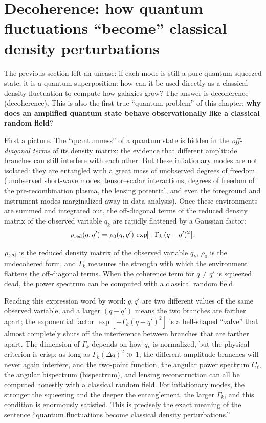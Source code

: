 \section{Decoherence: how quantum fluctuations ``become'' classical density perturbations}
\label{sec:e23-decoherence}

The previous section left an unease: if each mode is still a pure quantum squeezed state, it is a quantum superposition: how can it be used directly as a classical density fluctuation to compute how galaxies grow? The answer is decoherence (decoherence). This is also the first true ``quantum problem'' of this chapter: \textbf{why does an amplified quantum state behave observationally like a classical random field}?

First a picture. The ``quantumness'' of a quantum state is hidden in the \emph{off-diagonal terms} of its density matrix: the evidence that different amplitude branches can still interfere with each other. But these inflationary modes are not isolated: they are entangled with a great mass of unobserved degrees of freedom (unobserved short-wave modes, tensor--scalar interactions, degrees of freedom of the pre-recombination plasma, the lensing potential, and even the foreground and instrument modes marginalized away in data analysis). Once these environments are summed and integrated out, the off-diagonal terms of the reduced density matrix of the observed variable \(q_k\) are rapidly flattened by a Gaussian factor:
\begin{equation}
  \rho_{\rm red}(q,q')=\rho_0(q,q')\,\exp\!\bigl[-\Gamma_k\,(q-q')^2\bigr] .
  \label{eq:e23-decoherence-density}
\end{equation}
\begin{formulaexplain}
\(\rho_{\rm red}\) is the reduced density matrix of the observed variable \(q_k\), \(\rho_0\) is the undecohered form, and \(\Gamma_k\) measures the strength with which the environment flattens the off-diagonal terms. When the coherence term for \(q\ne q'\) is squeezed dead, the power spectrum can be computed with a classical random field.
\end{formulaexplain}
Reading this expression word by word: \(q,q'\) are two different values of the same observed variable, and a larger \((q-q')\) means the two branches are farther apart; the exponential factor \(\exp[-\Gamma_k(q-q')^2]\) is a bell-shaped ``valve'' that almost completely shuts off the interference between branches that are farther apart. The dimension of \(\Gamma_k\) depends on how \(q_k\) is normalized, but the physical criterion is crisp: as long as \(\Gamma_k(\Delta q)^2\gg1\), the different amplitude branches will never again interfere, and the two-point function, the angular power spectrum \(C_\ell\), the angular bispectrum (bispectrum), and lensing reconstruction can all be computed honestly with a classical random field. For inflationary modes, the stronger the squeezing and the deeper the entanglement, the larger \(\Gamma_k\), and this condition is enormously satisfied. This is precisely the exact meaning of the sentence ``quantum fluctuations become classical density perturbations.''

